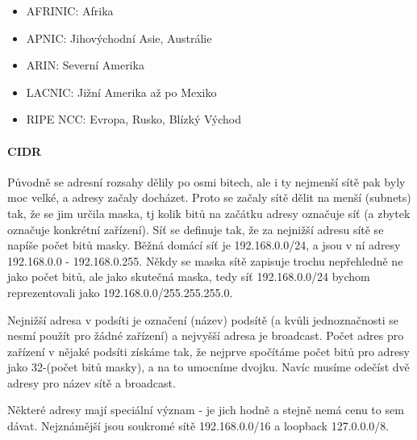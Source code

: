 \begin{itemize}
\item AFRINIC: Afrika
\item APNIC: Jihovýchodní Asie, Austrálie
\item ARIN: Severní Amerika
\item LACNIC: Jižní Amerika až po Mexiko
\item RIPE NCC: Evropa, Rusko, Blízký Východ
\end{itemize}

\paragraph{CIDR} Původně se adresní rozsahy dělily po osmi bitech, ale i ty nejmenší sítě pak byly moc velké, a adresy začaly docházet. Proto se začaly sítě dělit na menší (subnets) tak, že se jim určila maska, tj kolik bitů na začátku adresy označuje síť (a zbytek označuje konkrétní zařízení). Síť se definuje tak, že za nejnižší adresu sítě se napíše počet bitů masky. Běžná domácí síť je 192.168.0.0/24, a jsou v ní adresy 192.168.0.0 - 192.168.0.255. Někdy se maska sítě zapisuje trochu nepřehledně ne jako počet bitů, ale jako skutečná maska, tedy síť 192.168.0.0/24 bychom reprezentovali jako 192.168.0.0/255.255.255.0.

Nejnižší adresa v podsíti je označení (název) podsítě (a kvůli jednoznačnosti se nesmí použít pro žádné zařízení) a nejvyšší adresa je broadcast. Počet adres pro zařízení v nějaké podsíti získáme tak, že nejprve spočítáme počet bitů pro adresy jako 32-(počet bitů masky), a na to umocníme dvojku. Navíc musíme odečíst dvě adresy pro název sítě a broadcast.

Některé adresy mají speciální význam - je jich hodně a stejně nemá cenu to sem dávat. Nejznámější jsou soukromé sítě 192.168.0.0/16 a loopback 127.0.0.0/8.

